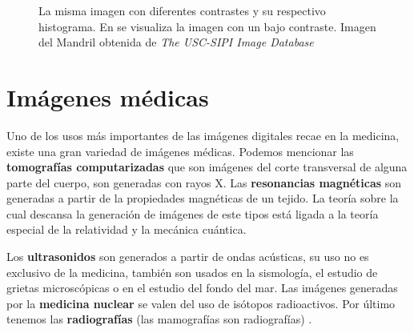 \begin{figure}[h]
    \centering


    \bigskip


  \caption[Histogramas]{La misma imagen con diferentes contrastes y su respectivo histograma. En \protect{} se visualiza la imagen con un bajo contraste.
  Imagen del Mandril obtenida de \textit{The USC-SIPI Image Database}}
  
  \label{fig:histograms}
\end{figure}

\section{Imágenes médicas}

Uno de los usos más importantes de las imágenes digitales recae en la medicina,
existe una gran variedad de imágenes médicas. Podemos mencionar las
\textbf{tomografías computarizadas} que son imágenes del corte transversal de
alguna parte del cuerpo, son generadas con rayos X. Las \textbf{resonancias
magnéticas} son generadas a partir de la propiedades magnéticas de un tejido.
La teoría sobre la cual descansa la generación de imágenes de este tipos está
ligada a la teoría especial de la relatividad y la mecánica cuántica.

Los \textbf{ultrasonidos} son generados a partir de ondas acústicas, su uso no
es exclusivo de la medicina, también son usados en la sismología, el estudio de
grietas microscópicas o en el estudio del fondo del mar. Las imágenes generadas
por la \textbf{medicina nuclear} se valen del uso de isótopos radioactivos. Por
último tenemos las \textbf{radiografías} (las mamografías son radiografías)
\cite{suetens2009fundamentals}.

